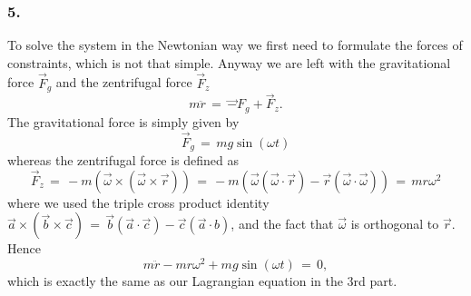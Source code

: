 \subsubsection{5.}
To solve the system in the Newtonian way we first need to formulate the forces
of constraints, which is not that simple. Anyway we are left with the
gravitational force $\vec F_g$ and the zentrifugal force $\vec F_z$
\begin{equation*}
  m \ddot r \,=\, \vec -F_g + \vec F_z.
\end{equation*}
The gravitational force is simply given by
\begin{equation*}
  \vec F_g \,=\, m g \sin(\omega t) 
\end{equation*}
whereas the zentrifugal force is defined as
\begin{equation*}
  \vec F_z \,=\, - m ( \vec \omega \times ( \vec \omega \times \vec r ) ) \,=\, -
m( \vec \omega (\vec \omega \cdot \vec r) - \vec r (\vec \omega \cdot \vec
\omega)) \,=\, m r \omega^2 
\end{equation*}
where we used the triple cross product identity $\vec a \times ( \vec b \times
\vec c) \,=\, \vec b (\vec a \cdot \vec c) - \vec c( \vec a \cdot b )$, and the
fact that $\vec \omega$ is orthogonal to $\vec r$. Hence 
\begin{equation*}
  m \ddot r - m r \omega^2 + m g\sin(\omega t) \,=\, 0,
\end{equation*}
which is exactly the same as our Lagrangian equation in the 3rd part.
